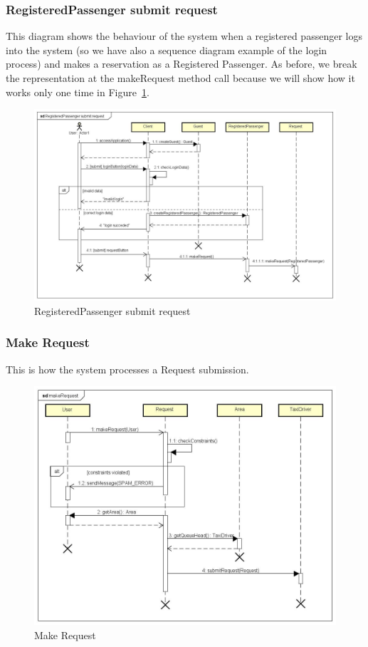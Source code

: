 		\subsubsection{RegisteredPassenger submit request}
		This diagram shows the behaviour of the system when a registered passenger logs into the system (so
		we have also a sequence diagram example of the login process) and makes a reservation as a
		Registered Passenger. As before, we break the representation at the makeRequest method call
		because we will show how it works only one time in Figure~\ref{fig:makeRequest}.
		\begin{figure}[h!]
			\begin{center}
				\includegraphics[width=1\linewidth]{../SE2_SD/RegisteredPassengerSubmitRequest}
				\caption{RegisteredPassenger submit request}
			\end{center}
		\end{figure}
		\clearpage
		\subsubsection{Make Request}
		This is how the system processes a Request submission.
		\begin{figure}[h!]
			\begin{center}
				\includegraphics[width=1\linewidth]{../SE2_SD/makeRequest}
				\caption{Make Request}
				\label{fig:makeRequest}
			\end{center}
		\end{figure}
		\clearpage
